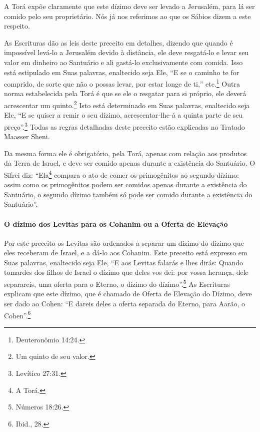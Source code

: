 A Torá expõe claramente que este dízimo deve ser levado a Jerusalém,
para lá ser comido pelo seu proprietário. Nós já nos referimos ao que os
Sábios dizem a este respeito.

As Escrituras dão as leis deste preceito em detalhes, dizendo que quando
é impossível levá-lo a Jerusalém devido à distância, ele deve resgatá-lo
e levar seu valor em dinheiro ao Santuário e ali gastá-lo
exclusivamente com comida. Isso está estipulado em Suas palavras,
enaltecido seja Ele, ``E se o caminho te for comprido, de sorte que não o possas levar, por estar longe de ti,'' etc.\footnote{Deuteronômio 14:24.} Outra norma estabelecida pela Torá é que se ele o resgatar para si próprio, ele deverá acrescentar um
quinto.\footnote{Um quinto de seu valor.} Isto está determinado em Suas palavras,
enaltecido seja Ele, ``E se quiser a remir o seu dízimo, acrescentar-lhe-á a quinta parte de seu preço''.\footnote{Levítico 27:31.}
Todas as regras detalhadas deste preceito estão explicadas no Tratado Maasser
Sheni.

Da mesma forma ele é obrigatório, pela Torá, apenas com relação aos
produtos da Terra de Israel, e deve ser comido apenas durante a
existência do Santuário. O Sifrei diz: ``Ela\footnote{A Torá.}
compara o ato de comer os primogênitos ao segundo dízimo: assim como os
primogênitos podem ser comidos apenas durante a existência do
Santuário, o segundo dízimo também só pode ser comido durante a
existência do Santuário''.

\paragraph{O dízimo dos Levitas para os Cohanim ou a Oferta de Elevação}

Por este preceito os Levitas são ordenados a separar um dízimo do dízimo
que eles receberam de Israel, e a dá-lo aos Cohanim. Este preceito
está expresso em Suas palavras, enaltecido seja Ele, ``E aos Levitas
falarás e lhes dirás: Quando tomardes dos filhos de Israel o dízimo que
deles vos dei: por vossa herança, dele separareis, uma oferta para o
Eterno, o dízimo do dízimo''.\footnote{Números 18:26.} As Escrituras explicam que
este dízimo, que é chamado de Oferta de Elevação do Dízimo, deve ser
dado ao Cohen: ``E dareis deles a oferta separada do Eterno, para
Aarão, o Cohen''.\footnote{Ibid., 28.}

